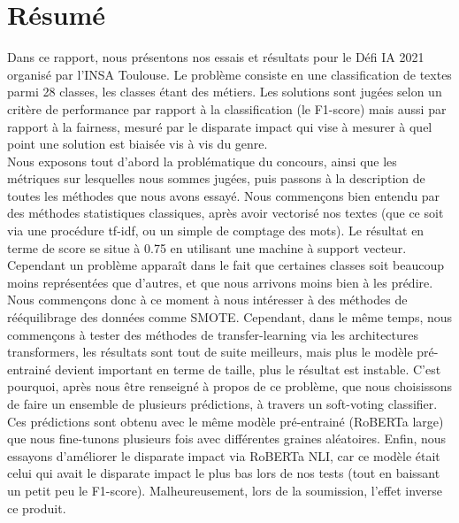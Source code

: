 \chapter{Résumé}

Dans ce rapport, nous présentons nos essais et résultats pour le Défi IA 2021 organisé par l'INSA Toulouse. Le problème consiste en une classification de textes parmi 28 classes, les classes étant des métiers. Les solutions sont jugées selon un critère de performance par rapport à la classification (le F1-score) mais aussi par rapport à la fairness, mesuré par le disparate impact qui vise à mesurer à quel point une solution est biaisée vis à vis du genre. \\
Nous exposons tout d'abord la problématique du concours, ainsi que les métriques sur lesquelles nous sommes jugées, puis passons à la description de toutes les méthodes que nous avons essayé. Nous commençons bien entendu par des méthodes statistiques classiques, après avoir  vectorisé nos textes (que ce soit via une procédure tf-idf, ou un simple de comptage des mots). Le résultat en terme de score se situe à 0.75 en utilisant une machine à support vecteur. Cependant un problème apparaît dans le fait que certaines classes soit beaucoup moins représentées que d'autres, et que nous arrivons moins bien à les prédire. Nous commençons donc à ce moment à nous intéresser à des méthodes de rééquilibrage des données comme SMOTE. Cependant, dans le même temps, nous commençons à tester des méthodes de transfer-learning via les architectures transformers, les résultats sont tout de suite meilleurs, mais plus le modèle pré-entrainé devient important en terme de taille, plus le résultat est instable. C'est pourquoi, après nous être renseigné à propos de ce problème, que nous choisissons de faire un ensemble de plusieurs prédictions, à travers un soft-voting classifier. Ces prédictions sont obtenu avec le même modèle pré-entrainé (RoBERTa large) que nous fine-tunons plusieurs fois avec différentes graines aléatoires. Enfin, nous essayons d'améliorer le disparate impact via  RoBERTa NLI, car ce modèle était celui qui avait le disparate impact le plus bas lors de nos tests (tout en baissant un petit peu le F1-score). Malheureusement, lors de la soumission, l'effet inverse ce produit.

